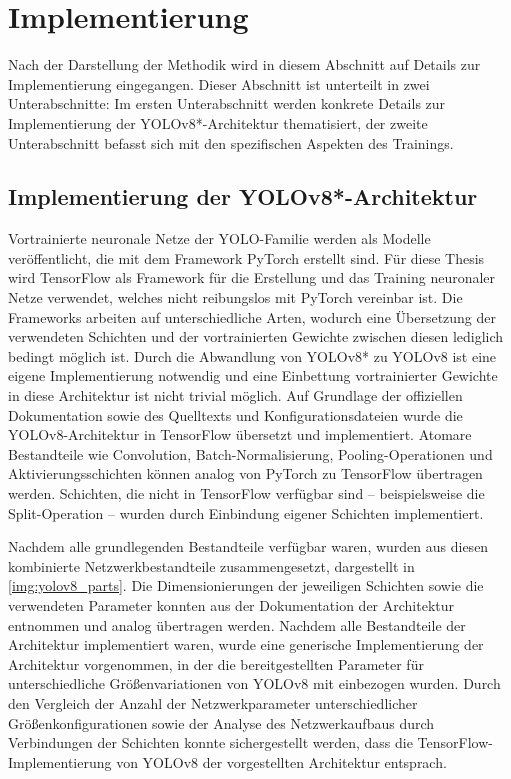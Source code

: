 
\section{Implementierung}
\label{sec:ki:implementierung}

Nach der Darstellung der Methodik wird in diesem Abschnitt auf Details zur Implementierung eingegangen. Dieser Abschnitt ist unterteilt in zwei Unterabschnitte: Im ersten Unterabschnitt werden konkrete Details zur Implementierung der YOLOv8*-Architektur thematisiert, der zweite Unterabschnitt befasst sich mit den spezifischen Aspekten des Trainings.


\subsection{Implementierung der YOLOv8*-Architektur}
\label{sec:yolov8_implementierung}

Vortrainierte neuronale Netze der YOLO-Familie werden als Modelle veröffentlicht, die mit dem Framework PyTorch erstellt sind. Für diese Thesis wird TensorFlow als Framework für die Erstellung und das Training neuronaler Netze verwendet, welches nicht reibungslos mit PyTorch vereinbar ist. Die Frameworks arbeiten auf unterschiedliche Arten, wodurch eine Übersetzung der verwendeten Schichten und der vortrainierten Gewichte zwischen diesen lediglich bedingt möglich ist. Durch die Abwandlung von YOLOv8* zu YOLOv8 ist eine eigene Implementierung notwendig und eine Einbettung vortrainierter Gewichte in diese Architektur ist nicht trivial möglich. Auf Grundlage der offiziellen Dokumentation sowie des Quelltexts und Konfigurationsdateien wurde die YOLOv8-Architektur in TensorFlow übersetzt und implementiert. Atomare Bestandteile wie Convolution, Batch-Normalisierung, Pooling-Operationen und Aktivierungsschichten können analog von PyTorch zu TensorFlow übertragen werden. Schichten, die nicht in TensorFlow verfügbar sind -- beispielsweise die Split-Operation -- wurden durch Einbindung eigener Schichten implementiert.

Nachdem alle grundlegenden Bestandteile verfügbar waren, wurden aus diesen kombinierte Netzwerkbestandteile zusammengesetzt, dargestellt in \autoref{img:yolov8_parts}. Die Dimensionierungen der jeweiligen Schichten sowie die verwendeten Parameter konnten aus der Dokumentation der Architektur entnommen und analog übertragen werden. Nachdem alle Bestandteile der Architektur implementiert waren, wurde eine generische Implementierung der Architektur vorgenommen, in der die bereitgestellten Parameter für unterschiedliche Größenvariationen von YOLOv8 mit einbezogen wurden. Durch den Vergleich der Anzahl der Netzwerkparameter unterschiedlicher Größenkonfigurationen sowie der Analyse des Netzwerkaufbaus durch Verbindungen der Schichten konnte sichergestellt werden, dass die TensorFlow-Implementierung von YOLOv8 der vorgestellten Architektur entsprach.

